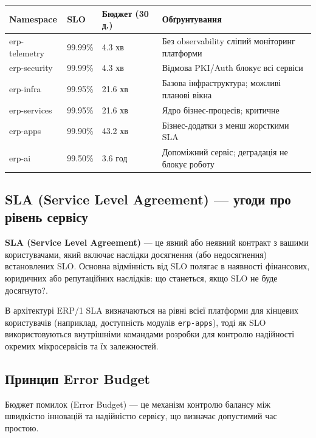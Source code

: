 \documentclass[12pt,a4paper]{article}
\begin{document}
\begin{longtable}{L{3.2cm} C{2.2cm} C{2.8cm} L{5.8cm}}
\toprule
{}
\color{primary}\textbf{Namespace} &
\color{primary}\textbf{SLO} &
\color{primary}\textbf{Бюджет (30 д.)} &
\color{primary}\textbf{Обґрунтування} \\
\midrule\endhead\bottomrule\endfoot
erp-telemetry & 99.99\% & 4.3 хв  & Без observability сліпий моніторинг платформи \\[2pt]
erp-security  & 99.99\% & 4.3 хв  & Відмова PKI/Auth блокує всі сервіси \\[2pt]
erp-infra     & 99.95\% & 21.6 хв & Базова інфраструктура; можливі планові вікна \\[2pt]
erp-services  & 99.95\% & 21.6 хв & Ядро бізнес-процесів; критичне \\[2pt]
erp-apps      & 99.90\% & 43.2 хв & Бізнес-додатки з менш жорсткими SLA \\[2pt]
erp-ai        & 99.50\% & 3.6 год & Допоміжний сервіс; деградація не блокує роботу \\[2pt]
\end{longtable}

\subsection{SLA (Service Level Agreement) --- угоди про рівень сервісу}

\textbf{SLA (Service Level Agreement)} --- це явний або неявний контракт з вашими користувачами,
який включає наслідки досягнення (або недосягнення) встановлених SLO. Основна відмінність від SLO
полягає в наявності фінансових, юридичних або репутаційних наслідків: \guillemotleft що станеться,
якщо SLO не буде досягнуто?\guillemotright.

В архітектурі ERP/1 SLA визначаються на рівні всієї платформи для кінцевих користувачів (наприклад,
доступність модулів \texttt{erp-apps}), тоді як SLO використовуються внутрішніми командами розробки
для контролю надійності окремих мікросервісів та їх залежностей.

\newpage
\subsection{Принцип Error Budget}

Бюджет помилок (Error Budget) --- це механізм контролю балансу між швидкістю інновацій
та надійністю сервісу, що визначає допустимий час простою.
\end{document}
